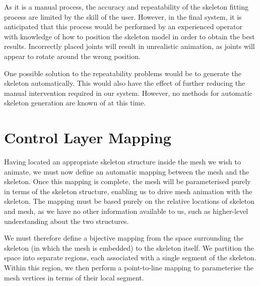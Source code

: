 As it is a manual process, the accuracy and repeatability of the skeleton fitting process are limited by the skill of the user. However, in the final system, it is anticipated that this process would be performed by an experienced operator with knowledge of how to position the skeleton model in order to obtain the best results. Incorrectly placed joints will result in unrealistic animation, as joints will appear to rotate around the wrong position.

One possible solution to the repeatability problems would be to generate the skeleton automatically. This would also have the effect of further reducing the manual intervention required in our system. However, no methods for automatic skeleton generation are known of at this time.

\section{\label{sec:skeletalanim:mapping}Control Layer Mapping}

Having located an appropriate skeleton structure inside the mesh we wish to animate, we must now define an automatic mapping between the mesh and the skeleton. Once this mapping is complete, the mesh will be parameterised purely in terms of the skeleton structure, enabling us to drive mesh animation with the skeleton. The mapping must be based purely on the relative locations of skeleton and mesh, as we have no other information available to us, such as higher-level understanding about the two structures. 

We must therefore define a bijective mapping from the space surrounding the skeleton (in which the mesh is embedded) to the skeleton itself. We partition the space into separate regions, each associated with a single segment of the skeleton. Within this region, we then perform a point-to-line mapping to parameterise the mesh vertices in terms of their local segment.

